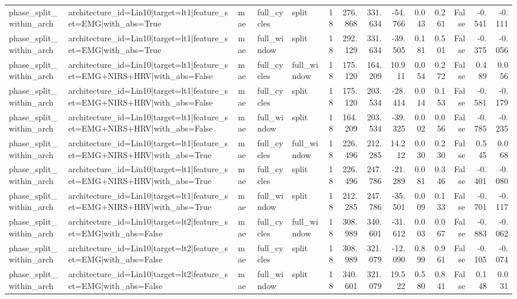 \begin{table}
\begin{tabular}{lllllrrrrrrrrr}
phase_split_within_arch & architecture_id=Lin10|target=lt1|feature_set=EMG|with_abs=True & mae & full_cycles & split & 18 & 276.868 & 331.634 & -54.766 & 0.043 & 0.261 & False & -0.541 & -0.111 \\
phase_split_within_arch & architecture_id=Lin10|target=lt1|feature_set=EMG|with_abs=True & mae & full_window & split & 18 & 292.129 & 331.634 & -39.505 & 0.181 & 0.501 & False & -0.375 & -0.056 \\
phase_split_within_arch & architecture_id=Lin10|target=lt1|feature_set=EMG+NIRS+HRV|with_abs=False & mae & full_cycles & full_window & 18 & 175.120 & 164.209 & 10.911 & 0.054 & 0.272 & False & 0.489 & 0.056 \\
phase_split_within_arch & architecture_id=Lin10|target=lt1|feature_set=EMG+NIRS+HRV|with_abs=False & mae & full_cycles & split & 18 & 175.120 & 203.534 & -28.414 & 0.014 & 0.153 & False & -0.581 & -0.179 \\
phase_split_within_arch & architecture_id=Lin10|target=lt1|feature_set=EMG+NIRS+HRV|with_abs=False & mae & full_window & split & 18 & 164.209 & 203.534 & -39.325 & 0.002 & 0.056 & False & -0.785 & -0.235 \\
phase_split_within_arch & architecture_id=Lin10|target=lt1|feature_set=EMG+NIRS+HRV|with_abs=True & mae & full_cycles & full_window & 18 & 226.496 & 212.285 & 14.212 & 0.030 & 0.230 & False & 0.545 & 0.068 \\
phase_split_within_arch & architecture_id=Lin10|target=lt1|feature_set=EMG+NIRS+HRV|with_abs=True & mae & full_cycles & split & 18 & 226.496 & 247.786 & -21.289 & 0.081 & 0.346 & False & -0.401 & -0.080 \\
phase_split_within_arch & architecture_id=Lin10|target=lt1|feature_set=EMG+NIRS+HRV|with_abs=True & mae & full_window & split & 18 & 212.285 & 247.786 & -35.501 & 0.009 & 0.133 & False & -0.701 & -0.117 \\
phase_split_within_arch & architecture_id=Lin10|target=lt2|feature_set=EMG|with_abs=False & mae & full_cycles & full_window & 18 & 308.989 & 340.601 & -31.612 & 0.003 & 0.067 & False & -0.883 & -0.062 \\
phase_split_within_arch & architecture_id=Lin10|target=lt2|feature_set=EMG|with_abs=False & mae & full_cycles & split & 18 & 308.989 & 321.079 & -12.090 & 0.899 & 0.961 & False & -0.105 & -0.074 \\
phase_split_within_arch & architecture_id=Lin10|target=lt2|feature_set=EMG|with_abs=False & mae & full_window & split & 18 & 340.601 & 321.079 & 19.522 & 0.580 & 0.841 & False & 0.148 & 0.031 \\

\end{tabular}
\end{table}
